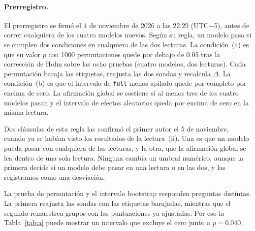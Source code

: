 \documentclass[10pt]{article}
\newcommand{\vr}[1]{\texttt{#1}}
\newcommand{\D}{\Delta}
\begin{document}
\paragraph{Prerregistro.}
El prerregistro se firmó el 4 de noviembre de 2026 a las 22:29 (UTC$-$5), antes de correr cualquiera de los cuatro
modelos nuevos. Según su regla, un modelo pasa si se cumplen dos condiciones en cualquiera de las dos lecturas. La
condición~(a) es que su valor $p$ con 1000 permutaciones quede por debajo de 0.05 tras la corrección de Holm
\citep{holm} sobre las ocho pruebas (cuatro modelos, dos lecturas). Cada permutación baraja las etiquetas, reajusta
las dos sondas y recalcula $\D$. La condición~(b) es que el intervalo de \vr{full} menos apilado quede por completo
por encima de cero. La afirmación global se sostiene si al menos tres de los cuatro modelos pasan y el intervalo de
efectos aleatorios queda por encima de cero en la misma lectura.

Dos cláusulas de esta regla las confirmó el primer autor el 5 de noviembre, cuando ya se habían visto los
resultados de la lectura~(ii). Una es que un modelo pueda pasar con cualquiera de las lecturas, y la otra, que la
afirmación global se lea dentro de una sola lectura. Ninguna cambia un umbral numérico, aunque la primera decide si
un modelo debe pasar en una lectura o en las dos, y las registramos como una desviación.

La prueba de permutación y el intervalo bootstrap responden preguntas distintas. La primera reajusta las sondas con
las etiquetas barajadas, mientras que el segundo remuestrea grupos con las puntuaciones ya ajustadas. Por eso la
Tabla~\ref{tab:a} puede mostrar un intervalo que excluye el cero junto a $p = 0.040$.
\end{document}
